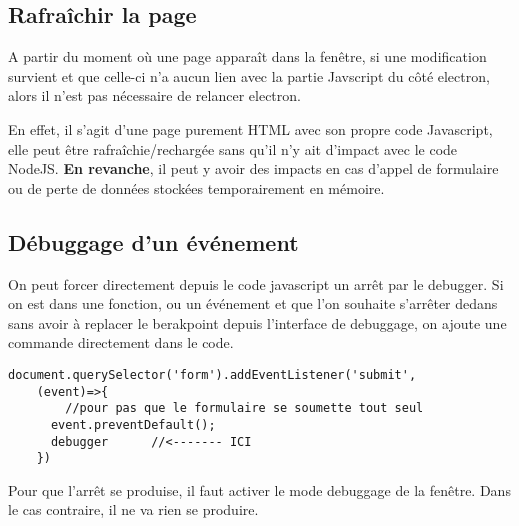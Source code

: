 \documentclass[12pt,oneside]{scrbook}
\begin{document}
\subsection{Rafraîchir la page}
A partir du moment où une page apparaît dans la fenêtre, si une modification survient et que celle-ci n'a aucun lien avec la partie Javscript du côté electron, alors il n'est pas nécessaire de relancer electron.

En effet, il s'agit d'une page purement HTML avec son propre code Javascript, elle peut être rafraîchie/rechargée sans qu'il n'y ait d'impact avec le code NodeJS. \textbf{En revanche}, il peut y avoir des impacts en cas d'appel de formulaire ou de perte de données stockées temporairement en mémoire.
\subsection{Débuggage d'un événement}
On peut forcer directement depuis le code javascript un arrêt par le debugger. Si on est dans une fonction, ou un événement et que l'on souhaite s'arrêter dedans sans avoir à replacer le berakpoint depuis l'interface de debuggage, on ajoute une commande directement dans le code.
\begin{verbatim}
document.querySelector('form').addEventListener('submit', 
    (event)=>{
        //pour pas que le formulaire se soumette tout seul
      event.preventDefault();  
      debugger      //<------- ICI
    })
\end{verbatim}
Pour que l'arrêt se produise, il faut activer le mode debuggage de la fenêtre. Dans le cas contraire, il ne va rien se produire.
\backmatter 

\printindex 
\end{document}
